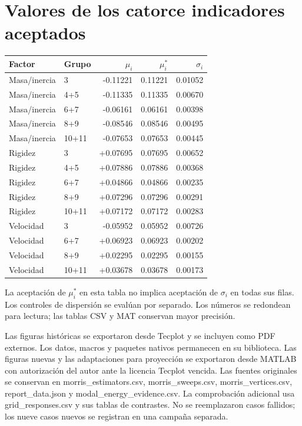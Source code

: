 \appendix
\section{Valores de los catorce indicadores aceptados}
\begin{center}\small
\begin{tabular}{llrrr}
\toprule Factor & Grupo & $\mu_i$ & $\mu_i^*$ & $\sigma_i$ \\ \midrule
Masa/inercia & 3 & -0.11221 & 0.11221 & 0.01052 \\
Masa/inercia & 4+5 & -0.11335 & 0.11335 & 0.00670 \\
Masa/inercia & 6+7 & -0.06161 & 0.06161 & 0.00398 \\
Masa/inercia & 8+9 & -0.08546 & 0.08546 & 0.00495 \\
Masa/inercia & 10+11 & -0.07653 & 0.07653 & 0.00445 \\
Rigidez & 3 & +0.07695 & 0.07695 & 0.00652 \\
Rigidez & 4+5 & +0.07886 & 0.07886 & 0.00368 \\
Rigidez & 6+7 & +0.04866 & 0.04866 & 0.00235 \\
Rigidez & 8+9 & +0.07296 & 0.07296 & 0.00291 \\
Rigidez & 10+11 & +0.07172 & 0.07172 & 0.00283 \\
Velocidad & 3 & -0.05952 & 0.05952 & 0.00726 \\
Velocidad & 6+7 & +0.06923 & 0.06923 & 0.00202 \\
Velocidad & 8+9 & +0.02295 & 0.02295 & 0.00155 \\
Velocidad & 10+11 & +0.03678 & 0.03678 & 0.00173 \\

\bottomrule
\end{tabular}
\end{center}
La aceptación de $\mu_i^*$ en esta tabla no implica aceptación de $\sigma_i$ en todas sus filas. Los controles de dispersión se evalúan por separado. Los números se redondean para lectura; las tablas CSV y MAT conservan mayor precisión.

Las figuras históricas se exportaron desde Tecplot y se incluyen como PDF externos. Los datos, macros y paquetes nativos permanecen en su biblioteca. Las figuras nuevas y las adaptaciones para proyección se exportaron desde MATLAB con autorización del autor ante la licencia Tecplot vencida. Las fuentes originales se conservan en morris\_estimators.csv, morris\_sweeps.csv, morris\_vertices.csv, report\_data.json y modal\_energy\_evidence.csv. La comprobación adicional usa grid\_responses.csv y sus tablas de contrastes. No se reemplazaron casos fallidos; los nueve casos nuevos se registran en una campaña separada.

